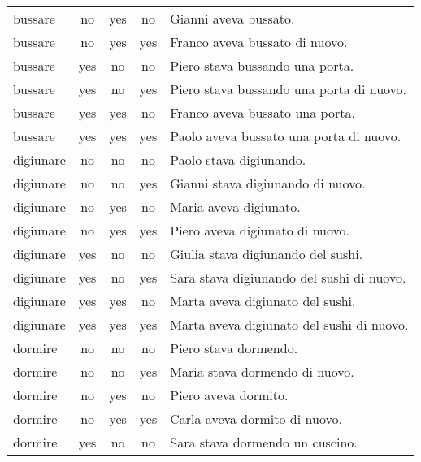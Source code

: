 \begin{longtable}{l|ccc|p{5cm}}
bussare    & no   & yes        & no        & Gianni aveva bussato.                            \\
bussare    & no   & yes        & yes       & Franco aveva bussato di nuovo.                   \\
bussare    & yes  & no         & no        & Piero stava bussando una porta.                  \\
bussare    & yes  & no         & yes       & Piero stava bussando una porta di nuovo.         \\
bussare    & yes  & yes        & no        & Franco aveva bussato una porta.                  \\
bussare    & yes  & yes        & yes       & Paolo aveva bussato una porta di nuovo.          \\
digiunare  & no   & no         & no        & Paolo stava digiunando.                          \\
digiunare  & no   & no         & yes       & Gianni stava digiunando di nuovo.                \\
digiunare  & no   & yes        & no        & Maria aveva digiunato.                           \\
digiunare  & no   & yes        & yes       & Piero aveva digiunato di nuovo.                  \\
digiunare  & yes  & no         & no        & Giulia stava digiunando del sushi.               \\
digiunare  & yes  & no         & yes       & Sara stava digiunando del sushi di nuovo.        \\
digiunare  & yes  & yes        & no        & Marta aveva digiunato del sushi.                 \\
digiunare  & yes  & yes        & yes       & Marta aveva digiunato del sushi di nuovo.        \\
dormire    & no   & no         & no        & Piero stava dormendo.                            \\
dormire    & no   & no         & yes       & Maria stava dormendo di nuovo.                   \\
dormire    & no   & yes        & no        & Piero aveva dormito.                             \\
dormire    & no   & yes        & yes       & Carla aveva dormito di nuovo.                    \\
dormire    & yes  & no         & no        & Sara stava dormendo un cuscino.                  \\

\end{longtable}
